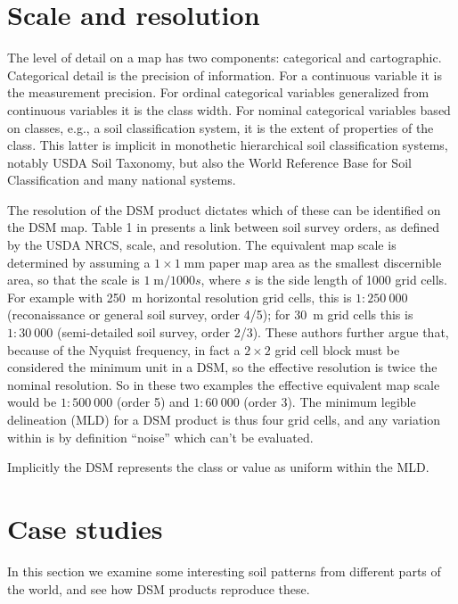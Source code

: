 \documentclass[soil, manuscript]{copernicus}
\begin{document}
\section{Scale and resolution}

\par
The level of detail on a map has two components: categorical and cartographic.
%
Categorical detail is the precision of information. For a continuous variable it is the measurement precision.
%
For ordinal categorical variables generalized from continuous variables it is the class width.
%
For nominal categorical variables based on classes, e.g., a soil classification system, it is the extent of properties of the class.
%
This latter is implicit in monothetic hierarchical soil classification systems, notably USDA Soil Taxonomy, but also the World Reference Base for Soil Classification and many national systems.

\par
The resolution of the DSM product dictates which of these can be identified on the DSM map.
%
Table 1 in \citep{mcbratneyDigitalSoilMapping2003} presents a link between soil survey orders, as defined by the USDA NRCS, scale, and resolution.
%
The equivalent map scale is determined by assuming a  $1 \times 1 \; \mathrm{mm}$ paper map area as the smallest discernible area, so that the scale is $1 \; \mathrm{m}/1000 s$, where $s$ is the side length of 1000 grid cells.
%
For example with 250~m horizontal resolution grid cells, this is $1:250~000$ (reconaissance or general soil survey, order 4/5); for 30~m  grid cells this is $1:30~000$ (semi-detailed soil survey, order 2/3).
%
These authors further argue that, because of the Nyquist frequency, in fact a $2 \times 2$ grid cell block must be considered the minimum unit in a DSM, so the effective resolution is twice the nominal resolution.
%
So in these two examples the effective equivalent map scale would be $1:500~000$ (order 5) and $1:60~000$ (order 3).
%
The minimum legible delineation (MLD) for a DSM product is thus four grid cells, and any variation within is by definition ``noise'' which can't be evaluated.

\par
Implicitly the DSM represents the class or value as uniform within the MLD.

\section{Case studies}

In this section we examine some interesting soil patterns from different parts of the world, and see how DSM products reproduce these.
\end{document}
